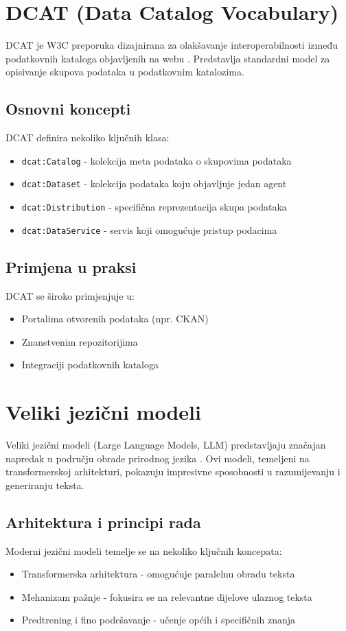 \section{DCAT (Data Catalog Vocabulary)}
\label{sec:dcat}

DCAT je W3C preporuka dizajnirana za olakšavanje interoperabilnosti između podatkovnih 
kataloga objavljenih na webu \cite{dcat2020}. Predstavlja standardni model za opisivanje 
skupova podataka u podatkovnim katalozima.

\subsection{Osnovni koncepti}
DCAT definira nekoliko ključnih klasa:
\begin{itemize}
    \item \texttt{dcat:Catalog} - kolekcija meta podataka o skupovima podataka
    \item \texttt{dcat:Dataset} - kolekcija podataka koju objavljuje jedan agent
    \item \texttt{dcat:Distribution} - specifična reprezentacija skupa podataka
    \item \texttt{dcat:DataService} - servis koji omogućuje pristup podacima
\end{itemize}

\subsection{Primjena u praksi}
DCAT se široko primjenjuje u:
\begin{itemize}
    \item Portalima otvorenih podataka (npr. CKAN)
    \item Znanstvenim repozitorijima
    \item Integraciji podatkovnih kataloga
\end{itemize}

\section{Veliki jezični modeli}
\label{sec:llm}

Veliki jezični modeli (Large Language Models, LLM) predstavljaju značajan napredak u 
području obrade prirodnog jezika \cite{brown2020language}. Ovi modeli, temeljeni na 
transformerskoj arhitekturi, pokazuju impresivne sposobnosti u razumijevanju i 
generiranju teksta.

\subsection{Arhitektura i principi rada}
Moderni jezični modeli temelje se na nekoliko ključnih koncepata:
\begin{itemize}
    \item Transformerska arhitektura - omogućuje paralelnu obradu teksta
    \item Mehanizam pažnje - fokusira se na relevantne dijelove ulaznog teksta
    \item Predtrening i fino podešavanje - učenje općih i specifičnih znanja
\end{itemize}

